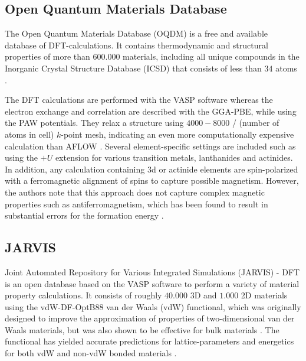\subsection{Open Quantum Materials Database}

The Open Quantum Materials Database (OQDM) \cite{Saal2013, Kirklin2015} is a free and available database of DFT-calculations. It contains thermodynamic and structural properties of more than $600.000$ materials, including all unique compounds in the Inorganic Crystal Structure Database (ICSD) that consists of less than $34$ atoms \cite{Ferrenti2020}.

The DFT calculations are performed with the VASP software whereas the electron exchange and correlation are described with the GGA-PBE, while using the PAW potentials. They relax a structure using $4000-8000$ / (number of atoms in cell) $k$-point mesh, indicating an even more computationally expensive calculation than AFLOW \cite{Ferrenti2020}. Several element-specific settings are included such as using the $+U$ extension for various transition metals, lanthanides and actinides. In addition, any calculation containing 3d or actinide elements are spin-polarized with a ferromagnetic alignment of spins to capture possible magnetism. However, the authors note that this approach does not capture complex magnetic properties such as antiferromagnetism, which has been found to result in substantial errors for the formation energy \cite{Stevanovic2012}.

\subsection{JARVIS}

Joint Automated Repository for Various Integrated Simulations (JARVIS) - DFT \cite{Choudhary2020} is an open database based on the VASP \cite{Kresse1996} software to perform a variety of material property calculations. It consists of roughly $40.000$ 3D and $1.000$ 2D materials using the vdW-DF-OptB88 van der Waals (vdW) functional, which was originally designed to improve the approximation of properties of two-dimensional van der Waals materials, but was also shown to be effective for bulk materials \cite{Thonhauser2007, Klimes2011}. The functional has yielded accurate predictions for lattice-parameters and energetics for both vdW and non-vdW bonded materials  \cite{Choudhary2018}.

